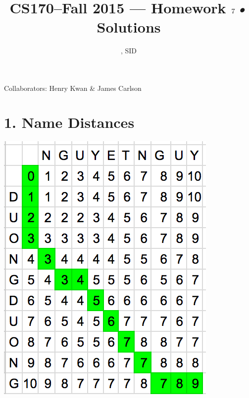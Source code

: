 \documentclass[11pt]{article}
\title{CS170--Fall 2015 --- Homework $7$\textsl{•} Solutions}
\author{\Name, SID \SID}
\date{}
\begin{document}
\maketitle

Collaborators: Henry Kwan \& James Carlson

\section*{1. Name Distances}
\includegraphics[scale=0.7]{hw71} \\

\newpage
\end{document}
